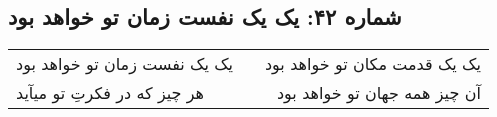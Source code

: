 \begin{center}
\section*{شماره ۴۲: یک یک نفست زمان تو خواهد بود}
\label{sec:042}
\begin{longtable}{l p{0.5cm} r}
یک یک نفست زمان تو خواهد بود
&&
یک یک قدمت مکان تو خواهد بود
\\
هر چیز که در فکرتِ تو میآید
&&
آن چیز همه جهان تو خواهد بود
\\
\end{longtable}
\end{center}
